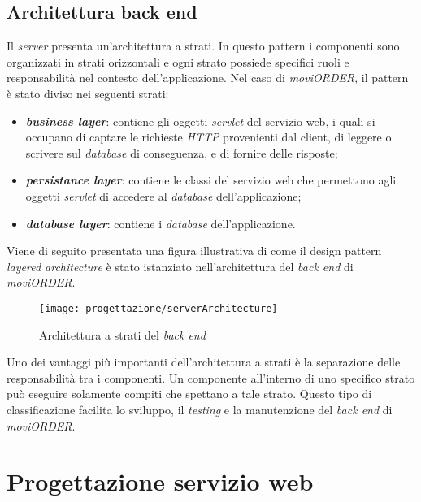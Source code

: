 \subsection{Architettura back end}

Il \textit{server} presenta un'architettura a strati. In questo pattern i componenti sono organizzati in strati orizzontali e ogni strato possiede specifici ruoli e responsabilità nel contesto dell'applicazione. Nel caso di \textit{moviORDER}, il pattern è stato diviso nei seguenti strati:
\begin{itemize}
	\item \textbf{\textit{business layer}}: contiene gli oggetti \textit{servlet} del servizio web, i quali si occupano di captare le richieste \textit{HTTP} provenienti dal client, di leggere o scrivere sul \textit{database} di conseguenza, e di fornire delle risposte;
	\item \textbf{\textit{persistance layer}}: contiene le classi del servizio web che permettono agli oggetti \textit{servlet} di accedere al \textit{database} dell'applicazione;
	\item \textbf{\textit{database layer}}: contiene i \textit{database} dell'applicazione.
\end{itemize}

\newpage

Viene di seguito presentata una figura illustrativa di come il design pattern \textit{layered architecture} è stato istanziato nell'architettura del \textit{back end} di \textit{moviORDER}. 

\begin{figure}[!h] 
    \centering 
    \texttt{[image: progettazione/serverArchitecture]} 
    \caption{Architettura a strati del \textit{back end}}
\end{figure}

Uno dei vantaggi più importanti dell'architettura a strati è la separazione delle responsabilità tra i componenti. Un componente all'interno di uno specifico strato può eseguire solamente compiti che spettano a tale strato. Questo tipo di classificazione facilita lo sviluppo, il \textit{testing} e la manutenzione del \textit{back end} di \textit{moviORDER}.

\newpage

\section{Progettazione servizio web}

